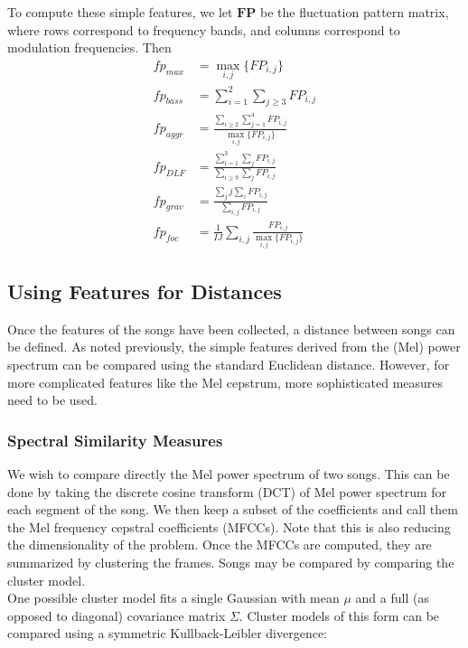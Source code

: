 \documentclass[12pt]{article}
\begin{document}
To compute these simple features, we let $\mathbf{FP}$ be the fluctuation pattern matrix, where rows correspond to frequency bands, and columns correspond to modulation frequencies.  Then
\begin{align*}
fp_{max} &= \max_{i,j} \{ FP_{i,j} \} \\
fp_{bass} &= \sum_{i=1}^2 \sum_{j \geq 3} FP_{i,j} \\
fp_{aggr} &= \frac{\sum_{i \geq 2} \sum_{j=1}^4 FP_{i,j} }{ \max_{i,j} \{ FP_{i,j} \}} \\
fp_{DLF} &= \frac{ \sum_{i=1}^3 \sum_j FP_{i,j} }{ \sum_{i\geq 9} \sum_j FP_{i,j} } \\
fp_{grav} &= \frac{ \sum_j j \sum_{i} FP_{i,j} }{ \sum_{i,j} FP_{i,j} } \\
fp_{foc} &= \frac{1}{I J} \sum_{i,j} \frac{FP_{i,j}}{ \max_{i,j} \{ FP_{i,j} \} }
\end{align*}

\subsection{Using Features for Distances}

Once the features of the songs have been collected, a distance between songs can be defined.  As noted previously, the simple features derived from the (Mel) power spectrum can be compared using the standard Euclidean distance.  However, for more complicated features like the Mel cepstrum, more sophisticated measures need to be used.

\subsubsection{Spectral Similarity Measures}
We wish to compare directly the Mel power spectrum of two songs.  This can be done by taking the discrete cosine transform (DCT) of Mel power spectrum for each segment of the song.  We then keep a subset of the coefficients and call them the Mel frequency cepstral coefficients (MFCCs).  Note that this is also reducing the dimensionality of the problem.  Once the MFCCs are computed, they are summarized by clustering the frames.  Songs may be compared by comparing the cluster model.\\

One possible cluster model fits a single Gaussian with mean $\mu$ and a full (as opposed to diagonal) covariance matrix $\Sigma$.  Cluster models of this form can be compared using a symmetric Kullback-Leibler divergence:
\end{document}
